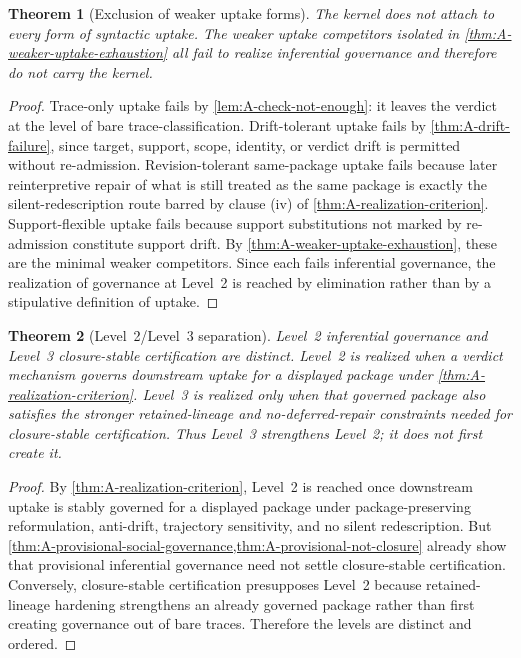 \documentclass[11pt]{article}
\theoremstyle{plain}
\newtheorem{theorem}{Theorem}[section]
\theoremstyle{definition}
\begin{document}
\begin{theorem}[Exclusion of weaker uptake forms]
\label{thm:A-weaker-uptake-exclusion}
The kernel does not attach to every form of syntactic uptake. The weaker uptake competitors isolated in \cref{thm:A-weaker-uptake-exhaustion} all fail to realize inferential governance and therefore do not carry the kernel.
\end{theorem}

\begin{proof}
Trace-only uptake fails by \cref{lem:A-check-not-enough}: it leaves the verdict at the level of bare trace-classification. Drift-tolerant uptake fails by \cref{thm:A-drift-failure}, since target, support, scope, identity, or verdict drift is permitted without re-admission. Revision-tolerant same-package uptake fails because later reinterpretive repair of what is still treated as the same package is exactly the silent-redescription route barred by clause (iv) of \cref{thm:A-realization-criterion}. Support-flexible uptake fails because support substitutions not marked by re-admission constitute support drift. By \cref{thm:A-weaker-uptake-exhaustion}, these are the minimal weaker competitors. Since each fails inferential governance, the realization of governance at Level~2 is reached by elimination rather than by a stipulative definition of uptake.
\end{proof}

\begin{theorem}[Level~2/Level~3 separation]
\label{thm:A-level-separation}
Level~2 inferential governance and Level~3 closure-stable certification are distinct. Level~2 is realized when a verdict mechanism governs downstream uptake for a displayed package under \cref{thm:A-realization-criterion}. Level~3 is realized only when that governed package also satisfies the stronger retained-lineage and no-deferred-repair constraints needed for closure-stable certification. Thus Level~3 strengthens Level~2; it does not first create it.
\end{theorem}

\begin{proof}
By \cref{thm:A-realization-criterion}, Level~2 is reached once downstream uptake is stably governed for a displayed package under package-preserving reformulation, anti-drift, trajectory sensitivity, and no silent redescription. But \cref{thm:A-provisional-social-governance,thm:A-provisional-not-closure} already show that provisional inferential governance need not settle closure-stable certification. Conversely, closure-stable certification presupposes Level~2 because retained-lineage hardening strengthens an already governed package rather than first creating governance out of bare traces. Therefore the levels are distinct and ordered.
\end{proof}
\end{document}
